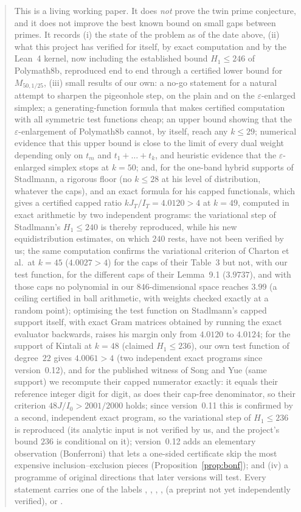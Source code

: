 

\begin{abstract}
This is a living working paper. It does \emph{not} prove the twin prime
conjecture, and it does not improve the best known bound on small gaps between
primes. It records (i) the state of the problem as of the date above, (ii) what
this project has verified for itself, by exact computation and by the Lean~4
kernel, now including the established bound $H_1\le246$ of Polymath8b,
reproduced end to end through a certified lower bound for $M_{50,1/25}$,
(iii) small results of our own: a no-go statement for a natural
attempt to sharpen the pigeonhole step, on the plain and on the
$\varepsilon$-enlarged simplex; a generating-function formula that makes
certified computation with all symmetric test functions cheap; an upper
bound showing that the $\varepsilon$-enlargement of Polymath8b cannot, by
itself, reach any $k\le29$; numerical evidence that this upper bound is close
to the limit of every dual weight depending only on $t_m$ and $t_1+\dots+t_k$,
and heuristic evidence that the $\varepsilon$-enlarged simplex stops at
$k=50$; and, for the one-band hybrid supports of Stadlmann, a rigorous
floor (no $k\le28$ at his level of distribution, whatever the caps), and an
exact formula for his capped functionals, which gives a certified capped
ratio $kJ_T/I_T=4.0120>4$ at $k=49$, computed in exact arithmetic by two
independent programs: the variational step of Stadlmann's $H_1\le240$ is
thereby reproduced, while his new equidistribution estimates, on which $240$
rests, have not been verified by us; the same computation confirms the
variational criterion of Charton et al.\ at $k=45$ ($4.0027>4$) for the caps
of their Table~3 but not, with our test function, for the different caps of
their Lemma~9.1 ($3.9737$), and with those caps no polynomial in our
$846$-dimensional space reaches $3.99$ (a ceiling certified in ball
arithmetic, with weights checked exactly at a random point); optimising the test function on Stadlmann's
capped support itself, with exact Gram matrices obtained by running the exact
evaluator backwards, raises his margin only from $4.0120$ to $4.0124$;
for the support of Kintali at $k=48$ (claimed $H_1\le236$), our own test
function of degree~$22$ gives $4.0061>4$ (two independent exact programs since version~0.12), and
for the published witness of Song and Yue (same support) we recompute their
capped numerator exactly: it equals their reference integer digit for digit,
as does their cap-free denominator, so their criterion $48J/I_0>2001/2000$
holds; since version~0.11 this is confirmed by a second, independent exact
program, so the variational step of $H_1\le236$ is reproduced (its analytic
input is not verified by us, and the project's bound $236$ is conditional on
it); version~0.12 adds an elementary observation (Bonferroni) that lets a
one-sided certificate skip the most expensive inclusion--exclusion pieces
(Proposition~\ref{prop:bonf}); and
(iv) a programme of original
directions that later versions will test. Every statement carries one of the
labels , , ,
,  (a preprint not yet independently
verified), or .
\end{abstract}

\maketitle

